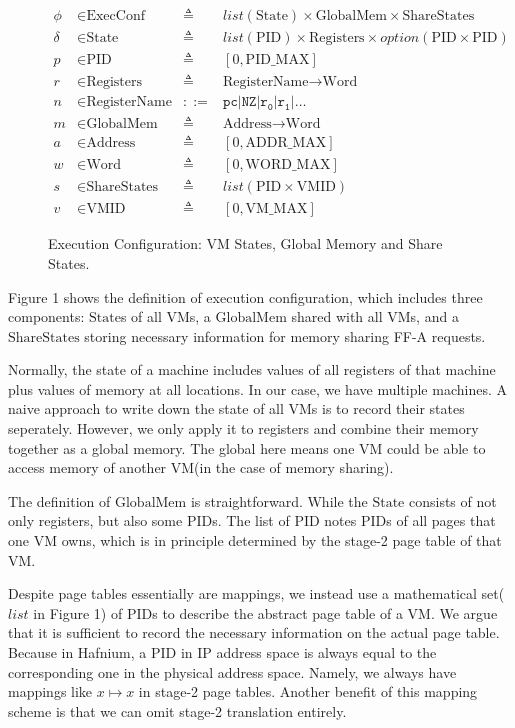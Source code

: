 \documentclass[a4paper]{article}
\newcommand*{\defined}{\triangleq}
\newcommand*{\maps}{\rightarrow}
\newcommand*{\derived}{::=}
\newcommand*{\CONF}{\text{ExecConf}}
\newcommand*{\STATE}{\text{State}}
\newcommand*{\MEM}{\text{GlobalMem}}
\newcommand*{\SSS}{\text{ShareStates}}
\newcommand*{\PID}{\text{PID}}
\newcommand*{\REGS}{\text{Registers}}
\newcommand*{\ADDR}{\text{Address}}
\newcommand*{\WORD}{\text{Word}}
\newcommand*{\VMID}{\text{VMID}}
\newcommand*{\REGNAMES}{\text{RegisterName}}
\newcommand*{\PAMAX}{\text{ADDR\_MAX}}
\newcommand*{\PPIDMAX}{\text{PID\_MAX}}
\newcommand*{\PWMAX}{\text{WORD\_MAX}}
\newcommand*{\PVMMAX}{\text{VM\_MAX}}
\begin{document}
\begin{figure}
  \begin{align*}
    \phi &\in \CONF &\defined &list(\STATE) \times \MEM \times \SSS \\
    \delta &\in \STATE &\defined &list(\PID) \times \REGS \times option(\PID \times \PID) \\
    p & \in \PID &\defined  &[ 0, \PPIDMAX ] \\
    r & \in \REGS &\defined  &\REGNAMES \maps \WORD \\
    n & \in \REGNAMES &\derived  &\mathtt{pc} | \mathtt{NZ} | \mathtt {r_{0}} | \mathtt{r_{1}} | \dots \\
    m & \in \MEM &\defined  &\ADDR \maps \WORD \\
    a & \in \ADDR &\defined  &[ 0, \PAMAX ] \\
    w & \in \WORD &\defined  &[ 0, \PWMAX ] \\
    s & \in \SSS &\defined  &list(\PID \times \VMID) \\
    v & \in \VMID &\defined  &[ 0, \PVMMAX ]
  \end{align*}
  \caption{Execution Configuration: VM States, Global Memory and Share States.}
\end{figure}
Figure 1 shows the definition of execution configuration, which includes three
components: $\STATE$s of all VMs, a $\MEM$ shared with all VMs, and a $\SSS$
storing necessary information for memory sharing FF-A requests.

Normally, the state of a machine includes values of all
registers of that machine plus values of memory at all locations. In our case,
we have multiple machines. A naive approach to write down the state of all VMs
is to record their states seperately. However, we only apply it to registers and
combine their memory together as a global memory. The global here means one VM
could be able to access memory of another VM(in the case of memory sharing).

The definition of $\MEM$ is straightforward. While the $\STATE$ consists of not
only registers, but also some $\PID$s.
The list of $\PID$ notes $\PID$s of all
pages that one VM owns, which is in principle determined by the stage-2 page
table of that VM.

Despite page tables essentially are mappings, we instead use a mathematical set($list$ in Figure 1) of $\PID$s to describe the abstract page table of a VM.
 We argue that it is sufficient to record the necessary information on the actual page table.
Because in Hafnium, a $\PID$ in IP address space is always equal to the corresponding one in the physical address space.
Namely, we always have mappings like $x \mapsto x$ in stage-2 page tables.
Another benefit of this mapping scheme is that we can omit stage-2 translation entirely.
\end{document}
